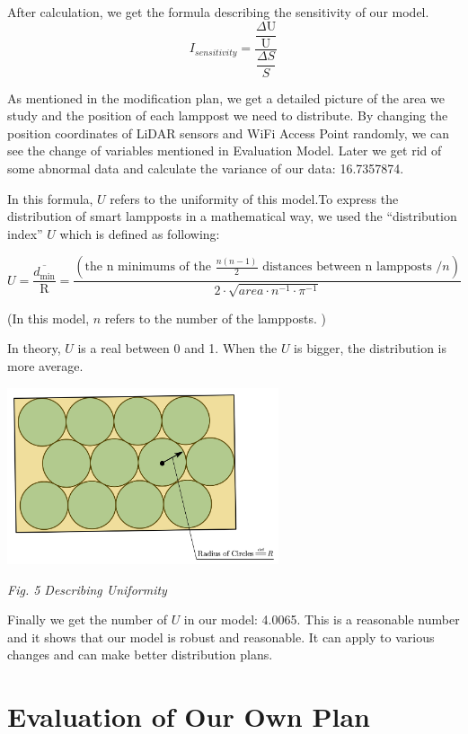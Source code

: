 \documentclass[12pt]{article}
\theoremstyle{definition}
\theoremstyle{remark}
\numberwithin{equation}{section}
\begin{document}
	After calculation, we get the formula describing the sensitivity of our model.
	$$I_{sensitivity}=\dfrac{\dfrac{\Delta \mathrm{U}}{\mathrm{U}}}{\dfrac{\Delta S}{S}}$$
	
	As mentioned in the modification plan,  we get a detailed picture of the area we study and the position of each lamppost we need to distribute. By changing the position coordinates of LiDAR sensors and WiFi Access Point randomly, we can see the change of variables mentioned in Evaluation Model. Later we get rid of some abnormal data and calculate the variance of our data: 16.7357874. 

	In this formula, $U$ refers to the uniformity of this model.To express the distribution of smart lampposts in a mathematical way, we used the “distribution index” $U$ which is defined as following:\cite{Sensitivity}
	
	$$U = \frac{\overline{d_\text{min}}}{\text{R}} = \frac{\left(\text{the }\text{n} \text{ minimums of the }\frac{n(n-1)}{2} \text{ distances between } \text{n} \text{ lampposts } /n \right)}{2 \cdot \sqrt{area \cdot n^{-1} \cdot \pi^{-1}}}$$	
	\begin{center}
	(In this model, $n$ refers to the number of the lampposts. )
	\end{center}

	In theory, $U$ is a real between 0 and 1. When the $U$ is bigger, the distribution is more average.
	\begin{center}
		\includegraphics[width=8cm]{uniformity.jpg}
		
		\small \textit{Fig. 5  Describing Uniformity}
	\end{center}
	
	Finally we get the number of $U$ in our model: 4.0065.
	This is a reasonable number and it shows that our model is robust and reasonable. It can apply to various changes and can make better distribution plans.
		
		
	
	
	\newpage
	\section{Evaluation of Our Own Plan}
\end{document}
